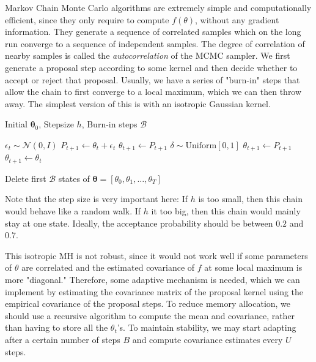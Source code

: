   Markov Chain Monte Carlo algorithms are extremely simple and computationally efficient, since they only require to compute $f(\theta)$, without any gradient information. They generate a sequence of correlated samples which on the long run converge to a sequence of independent samples. The degree of correlation of nearby samples is called the \textit{autocorrelation} of the MCMC sampler. We first generate a proposal step according to some kernel and then decide whether to accept or reject that proposal. Usually, we have a series of "burn-in" steps that allow the chain to first converge to a local maximum, which we can then throw away. The simplest version of this is with an isotropic Gaussian kernel. 

  \begin{algorithm}
    \caption{Random Walk Metropolis Hastings w/ Isotropic Gaussian Kernel}\label{alg:metropolis_gaussian}
    \begin{algorithmic}

    \Require Initial $\boldsymbol{\theta}_0$, Stepsize $h$, Burn-in steps $\mathcal{B}$

        \State $\epsilon_t \sim \mathcal{N}(0, I)$ 
        \State $P_{t+1} \gets \theta_t + \epsilon_t$
            \State $\theta_{t+1} \gets P_{t+1}$ 
        \Else
            \State $\delta \sim \mathrm{Uniform}[0, 1]$
                \State $\theta_{t+1} \gets P_{t+1}$ 
            \Else 
                \State $\theta_{t+1} \gets \theta_t$
            \EndIf
        \EndIf
    \EndFor

    \State Delete first $\mathcal{B}$ states of $\boldsymbol{\theta} = [\theta_0, \theta_1, \ldots, \theta_T]$

    \end{algorithmic}
  \end{algorithm}

  Note that the step size is very important here: If $h$ is too small, then this chain would behave like a random walk. If $h$ it too big, then this chain would mainly stay at one state. Ideally, the acceptance probability should be between $0.2$ and $0.7$. 

  This isotropic MH is not robust, since it would not work well if some parameters of $\theta$ are correlated and the estimated covariance of $f$ at some local maximum is more "diagonal." Therefore, some adaptive mechanism is needed, which we can implement by estimating the covariance matrix of the proposal kernel using the empirical covariance of the proposal steps. To reduce memory allocation, we should use a recursive algorithm to compute the mean and covariance, rather than having to store all the $\theta_t$'s. To maintain stability, we may start adapting after a certain number of steps $B$ and compute covariance estimates every $U$ steps. 

